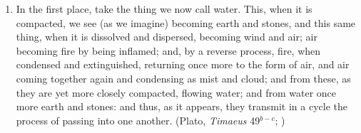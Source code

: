 \documentclass[10pt]{article}
\begin{document}
\begin{enumerate}
    \item In the first place, take the thing we now call water. This, when it is compacted, we see (as we imagine) becoming earth and stones, and this same thing, when it is dissolved and dispersed, becoming wind and air; air becoming fire by being inflamed; and, by a reverse process, fire, when condensed and extinguished, returning once more to the form of air, and air coming together again and condensing as mist and cloud; and from these, as they are yet more closely compacted, flowing water; and from water once more earth and stones: and thus, as it appears, they transmit in a cycle the process of passing into one another. (Plato, \emph{Timaeus} 49\( ^{b-c} \); \citealt[179]{Cornford:1935fk})
\end{enumerate}

 

\end{document}
